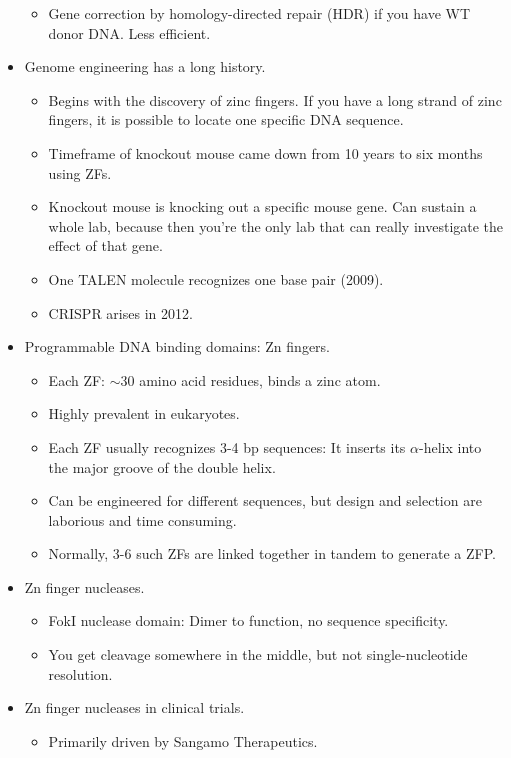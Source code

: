 \documentclass[../notes.tex]{subfiles}
\begin{document}
\begin{itemize}
\begin{itemize}
        \item Gene correction by homology-directed repair (HDR) if you have WT donor DNA. Less efficient.
    \end{itemize}
    \item Genome engineering has a long history.
    \begin{itemize}
        \item Begins with the discovery of zinc fingers. If you have a long strand of zinc fingers, it is possible to locate one specific DNA sequence.
        \item Timeframe of knockout mouse came down from 10 years to six months using ZFs.
        \item Knockout mouse is knocking out a specific mouse gene. Can sustain a whole lab, because then you're the only lab that can really investigate the effect of that gene.
        \item One TALEN molecule recognizes one base pair (2009).
        \item CRISPR arises in 2012.
    \end{itemize}
    \item Programmable DNA binding domains: Zn fingers.
    \begin{itemize}
        \item Each ZF: $\sim 30$ amino acid residues, binds a zinc atom.
        \item Highly prevalent in eukaryotes.
        \item Each ZF usually recognizes 3-4 bp sequences: It inserts its $\alpha$-helix into the major groove of the double helix.
        \item Can be engineered for different sequences, but design and selection are laborious and time consuming.
        \item Normally, 3-6 such ZFs are linked together in tandem to generate a ZFP.
    \end{itemize}
    \item Zn finger nucleases.
    \begin{itemize}
        \item FokI nuclease domain: Dimer to function, no sequence specificity.
        \item You get cleavage somewhere in the middle, but not single-nucleotide resolution.
    \end{itemize}
    \item Zn finger nucleases in clinical trials.
    \begin{itemize}
        \item Primarily driven by Sangamo Therapeutics.

\end{itemize}
\end{itemize}
\end{document}
